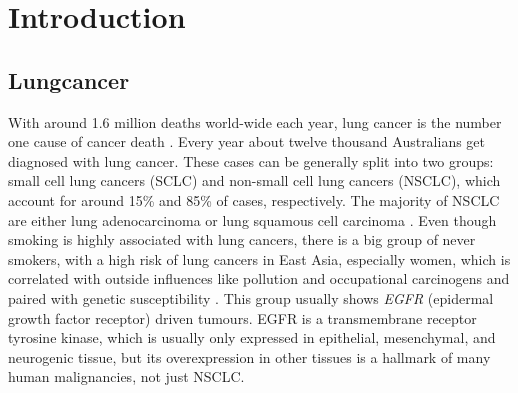 \section{Introduction}
\label{cascade-sec:intro}


\subsection{Lungcancer}
\label{intro-sec:lungcancer}

With around 1.6 million deaths world-wide each year, lung cancer is the number one cause of cancer death \cite{Siegel2018}. Every year about twelve thousand Australians get diagnosed with lung cancer. These cases can be generally split into two groups: small cell lung cancers (SCLC) and non-small cell lung cancers (NSCLC), which account for around 15\% and 85\% of cases, respectively. The majority of NSCLC are either lung adenocarcinoma or lung squamous cell carcinoma \cite{Molina2008}. Even though smoking is highly associated with lung cancers, there is a big group of never smokers, with a high risk of lung cancers in East Asia, especially women, which is correlated with outside influences like pollution and occupational carcinogens and paired with genetic susceptibility \cite{Sun2007}.
This group usually shows \textit{EGFR} (epidermal growth factor receptor) driven tumours. EGFR is a transmembrane receptor tyrosine kinase, which is usually only expressed in epithelial, mesenchymal, and neurogenic tissue, but its overexpression in other tissues is a hallmark of many human malignancies, not just NSCLC.


